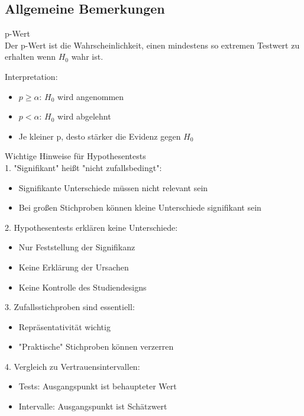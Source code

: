 \subsection{Allgemeine Bemerkungen}

\begin{concept}{p-Wert}\\
Der p-Wert ist die Wahrscheinlichkeit, einen mindestens so extremen Testwert zu erhalten wenn $H_0$ wahr ist.

Interpretation:
\begin{itemize}
  \item $p \geq \alpha$: $H_0$ wird angenommen
  \item $p < \alpha$: $H_0$ wird abgelehnt
  \item Je kleiner p, desto stärker die Evidenz gegen $H_0$
\end{itemize}
\end{concept}

\begin{KR}{Wichtige Hinweise für Hypothesentests}\\
1. "Signifikant" heißt "nicht zufallsbedingt":
   \begin{itemize}
     \item Signifikante Unterschiede müssen nicht relevant sein
     \item Bei großen Stichproben können kleine Unterschiede signifikant sein
   \end{itemize}

2. Hypothesentests erklären keine Unterschiede:
   \begin{itemize}
     \item Nur Feststellung der Signifikanz
     \item Keine Erklärung der Ursachen
     \item Keine Kontrolle des Studiendesigns
   \end{itemize}

3. Zufallsstichproben sind essentiell:
   \begin{itemize}
     \item Repräsentativität wichtig
     \item "Praktische" Stichproben können verzerren
   \end{itemize}

4. Vergleich zu Vertrauensintervallen:
   \begin{itemize}
     \item Tests: Ausgangspunkt ist behaupteter Wert
     \item Intervalle: Ausgangspunkt ist Schätzwert
   \end{itemize}
\end{KR}